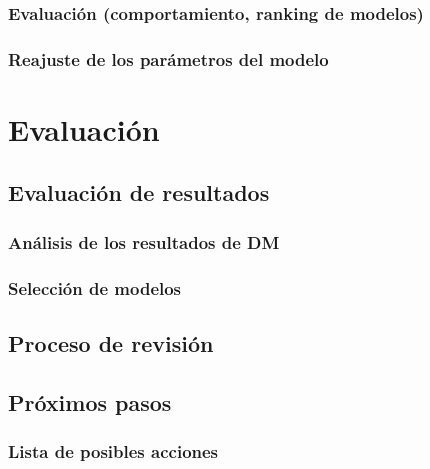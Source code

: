 \documentclass[11pt,a4paper,twoside]{tesis}
\begin{document}
\subsection{Evaluación (comportamiento, ranking de modelos)}
\subsection{Reajuste de los parámetros del modelo}

\chapter{Evaluación}
\section{Evaluación de resultados}
\subsection{Análisis de los resultados de DM}
\subsection{Selección de modelos}
\section{Proceso de revisión}
\section{Próximos pasos}

\subsection{Lista de posibles acciones}
\end{document}
